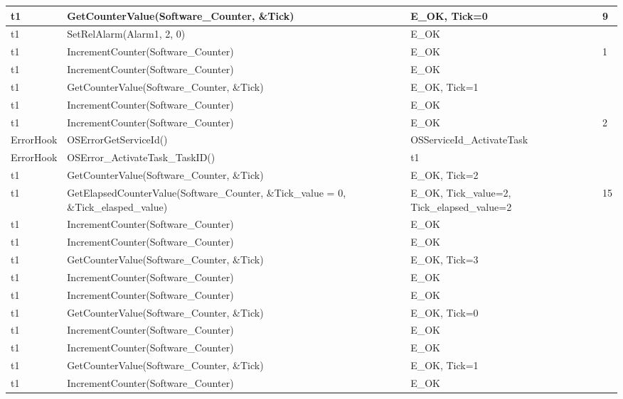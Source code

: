 \documentclass[10pt]{article}
\newlength{\Li}\settowidth{\Li}{Running}
\newlength{\Lii}\setlength{\Lii}{7cm}
\newlength{\Liiii}\setlength{\Liiii}{0.9cm}
\newlength{\Liii}\setlength{\Liii}{\textwidth} \addtolength{\Liii}{-\Li} \addtolength{\Liii}{-\Lii} \addtolength{\Liii}{-\Liiii}
\begin{document}
	\begin{supertabular}{|p{\Li}|p{\Lii}|p{\Liii}|p{\Liiii}|} \hline 
	t1	& GetCounterValue(Software\_Counter, \&Tick)					& E\_OK, Tick=0			& 9 \\ \hline
	t1	& SetRelAlarm(Alarm1, 2, 0)									& E\_OK					& \\ \hline
	t1	& IncrementCounter(Software\_Counter)							& E\_OK					& 1\\ \hline
	t1	& IncrementCounter(Software\_Counter)							& E\_OK					& \\ \hline
	t1	& GetCounterValue(Software\_Counter, \&Tick)					& E\_OK, Tick=1			& \\ \hline
	t1	& IncrementCounter(Software\_Counter)							& E\_OK					& \\ \hline
	t1	& IncrementCounter(Software\_Counter)							& E\_OK					& 2 \\ \hline
	ErrorHook		& OSErrorGetServiceId()								& OSServiceId\_ActivateTask	& \\ \hline
	ErrorHook		& OSError\_ActivateTask\_TaskID()						& t1						& \\ \hline
	t1	& GetCounterValue(Software\_Counter, \&Tick)					& E\_OK, Tick=2			& \\ \hline
	t1	& GetElapsedCounterValue(Software\_Counter, \&Tick\_value = 0, \&Tick\_elasped\_value)	& E\_OK, Tick\_value=2, Tick\_elapsed\_value=2	& 15 \\ \hline
	t1	& IncrementCounter(Software\_Counter)							& E\_OK					& \\ \hline
	t1	& IncrementCounter(Software\_Counter)							& E\_OK					& \\ \hline
	t1	& GetCounterValue(Software\_Counter, \&Tick)					& E\_OK, Tick=3			& \\ \hline
	t1	& IncrementCounter(Software\_Counter)							& E\_OK					& \\ \hline
	t1	& IncrementCounter(Software\_Counter)							& E\_OK					& \\ \hline
	t1	& GetCounterValue(Software\_Counter, \&Tick)					& E\_OK, Tick=0			& \\ \hline
	t1	& IncrementCounter(Software\_Counter)							& E\_OK					& \\ \hline
	t1	& IncrementCounter(Software\_Counter)							& E\_OK					& \\ \hline
	t1	& GetCounterValue(Software\_Counter, \&Tick)					& E\_OK, Tick=1			& \\ \hline
	t1	& IncrementCounter(Software\_Counter)							& E\_OK					& \\ \hline

\end{supertabular}
\end{document}

